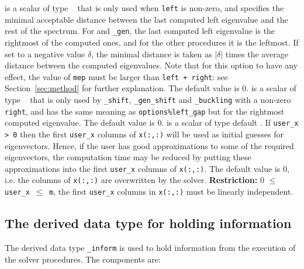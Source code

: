 \begin{description}
%
is a scalar of type \REALDP\ %
that is only used when
{\tt left} is non-zero, and
specifies the minimal acceptable distance
between the last computed left eigenvalue
and the rest of the spectrum.
For {\tt \solver} and {\tt \solver\_gen},
the last computed left eigenvalue
is the rightmost of the computed ones,
and for the other procedures
it is the leftmost.
If set to a negative value $\delta$,
the minimal distance is taken as
$|\delta|$ times the average distance between the computed eigenvalues.
Note that for this option to have any effect,
the value of {\tt mep} must be larger than
{\tt left + right}: see Section~\ref{sec:method}
for further explanation.
The default value is 0.
%
is a scalar of type \REALDP\ %
that is only used by 
{\tt \solver\_shift}, {\tt \solver\_gen\_shift}
and {\tt \solver\_buckling}
with a non-zero {\tt right}, and
has the same meaning as {\tt options\%left\_gap}
but for the rightmost computed eigenvalue.
The default value is 0.
%
 is a scalar of type default \Integer. 
If {\tt user\_x > 0} then the first {\tt user\_x} columns
of {\tt x(:,:)} will be used as initial guesses for eigenvectors.
Hence, if the user has good approximations
to some of the required eigenvectors, the computation time
may be reduced by putting these approximations
into the first {\tt user\_x} columns of {\tt x(:,:)}.
The default value is 0, 
i.e. the columns of {\tt x(:,:)} are overwritten by the solver.
{\bf Restriction:} {0 $\le$ \tt user\_x $\le$ m},
the first {\tt user\_x} columns in {\tt x(:,:)}
must be linearly independent.
%
\end{description}

\subsection{The derived data type for holding information}

\label{sec:inform}

The derived data type {\tt \solver\_inform} is used
to hold information from the execution of
the solver procedures.
The components are:

